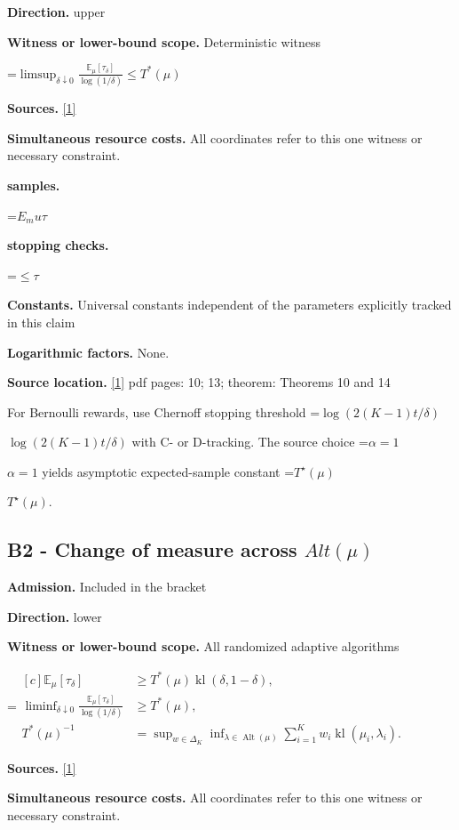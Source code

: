 \documentclass[10pt,a4paper]{article}
\newcommand{\AtlasMath}[1]{\par\begingroup\centering\setbox0=\hbox{$\displaystyle #1$}\ifdim\wd0>1.4\linewidth\typeout{ATLAS WIDE FORMULA: \the\wd0}\fi\ifdim\wd0>\linewidth\resizebox{\linewidth}{!}{\box0}\else\box0\fi\par\endgroup}
\newcommand{\AtlasInlineMath}[1]{\begingroup\setbox0=\hbox{$#1$}\ifdim\wd0>.4\linewidth\endgroup\AtlasMath{#1}\else\endgroup$#1$\fi}
\begin{document}
\textbf{Direction.} upper

\textbf{Witness or lower-bound scope.} Deterministic witness

\AtlasMath{\limsup_{\delta\downarrow0}\frac{\mathbb{E}_\mu[\tau_\delta]}{\log(1/\delta)}\le T^*(\mu)}
\textbf{Sources.} \href{https://proceedings.mlr.press/v49/garivier16a.pdf}{[1]}

\textbf{Simultaneous resource costs.} All coordinates refer to this one witness or necessary constraint.

\textbf{samples.}

\AtlasMath{E_mu \tau}
\textbf{stopping checks.}

\AtlasMath{\le \tau}
\textbf{Constants.} Universal constants independent of the parameters explicitly tracked in this claim

\textbf{Logarithmic factors.} None.

\textbf{Source location.} \href{https://proceedings.mlr.press/v49/garivier16a.pdf}{[1]} pdf pages: 10; 13; theorem: Theorems 10 and 14

For Bernoulli rewards, use Chernoff stopping threshold \AtlasInlineMath{\log(2(K-1)t/\delta)} with C- or D-tracking. The source choice \AtlasInlineMath{\alpha=1} yields asymptotic expected-sample constant \AtlasInlineMath{T^\star(\mu)}.

\subsection{B2 - Change of measure across $Alt(\mu )$}
\textbf{Admission.} Included in the bracket

\textbf{Direction.} lower

\textbf{Witness or lower-bound scope.} All randomized adaptive algorithms

\AtlasMath{\begin{aligned}[c]\mathbb{E}_\mu[\tau_\delta]&\ge T^*(\mu)\operatorname{kl}(\delta,1-\delta),\\ \liminf_{\delta\downarrow0}\frac{\mathbb{E}_\mu[\tau_\delta]}{\log(1/\delta)}&\ge T^*(\mu),\\ T^*(\mu)^{-1}&=\sup_{w\in\Delta_K}\inf_{\lambda\in\operatorname{Alt}(\mu)}\sum_{i=1}^K w_i\operatorname{kl}(\mu_i,\lambda_i).\end{aligned}}
\textbf{Sources.} \href{https://proceedings.mlr.press/v49/garivier16a.pdf}{[1]}

\textbf{Simultaneous resource costs.} All coordinates refer to this one witness or necessary constraint.
\end{document}
